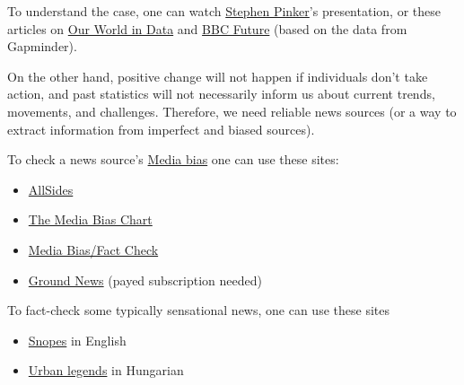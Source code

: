 \documentclass{article}
\begin{document}
To understand the case, one can watch \href{https://www.ted.com/talks/steven_pinker_is_the_world_getting_better_or_worse_a_look_at_the_numbers}{Stephen Pinker}'s presentation, or these articles on \href{https://ourworldindata.org/wrong-about-the-world}{Our World in Data} and \href{https://www.bbc.com/future/article/20190111-seven-reasons-why-the-world-is-improving}{BBC Future} (based on the data from Gapminder).

On the other hand, positive change will not happen if individuals don't take action, and past statistics will not necessarily inform us about current trends, movements, and challenges. Therefore, we need reliable news sources (or a way to extract information from imperfect and biased sources).

To check a news source's \href{https://en.wikipedia.org/wiki/Media_bias}{Media bias} one can use these sites:
\begin{itemize}
    \item \href{https://www.allsides.com/media-bias/media-bias-chart}{AllSides}
    \item \href{https://adfontesmedia.com/interactive-media-bias-chart/}{The Media Bias Chart}
    \item \href{https://mediabiasfactcheck.com}{Media Bias/Fact Check}
    \item \href{https://ground.news/}{Ground News} (payed subscription needed)
\end{itemize}

To fact-check some typically sensational news, one can use these sites
\begin{itemize}
    \item \href{https://www.snopes.com/}{Snopes} in English
    \item \href{https://www.urbanlegends.hu/}{Urban legends} in Hungarian
\end{itemize}
\end{document}
